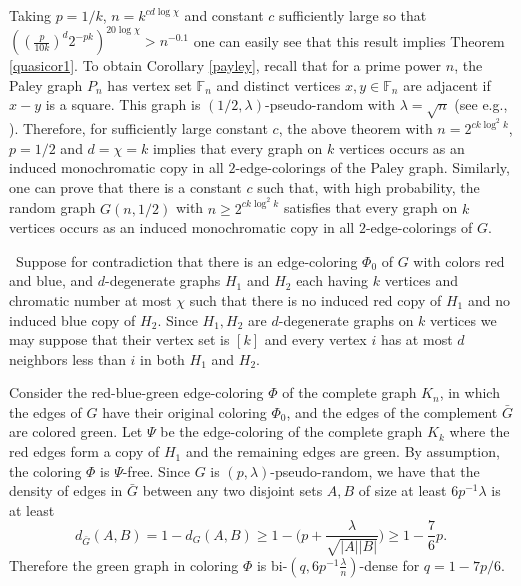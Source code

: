 \documentclass[11pt]{article}
\begin{document}
Taking $p=1/k$, $n=k^{cd\log \chi}$ and constant
$c$ sufficiently large so that $((\frac{p}{10k})^d2^{-pk})^{20\log \chi}>n^{-0.1}$
one can easily see that this result implies Theorem \ref{quasicor1}.
To obtain Corollary \ref{payley}, recall that for a prime power $n$, the Paley graph $P_n$ has vertex
set $\mathbb{F}_n$ and distinct vertices $x,y \in \mathbb{F}_n$ are
adjacent if $x-y$ is a square. This graph is $(1/2,\lambda)$-pseudo-random with $\lambda=\sqrt{n}$
(see e.g., \cite{KrSu}).
Therefore, for sufficiently large constant $c$, the above theorem with $n=2^{ck\log^2 k}$, $p=1/2$ and $d=\chi=k$
implies that every graph on $k$ vertices occurs as an
induced monochromatic copy in all $2$-edge-colorings of the Paley graph.
Similarly, one can prove that there is a constant $c$ such that, with high probability,
the random graph $G(n,1/2)$ with $n \geq 2^{ck\log^2 k}$ satisfies that every graph
on $k$ vertices occurs as an induced monochromatic copy in all
$2$-edge-colorings of $G$.


\vspace{0.1cm} \, Suppose for contradiction that there is
an edge-coloring $\Phi_0$ of $G$ with colors red and blue, and
$d$-degenerate graphs $H_1$ and $H_2$ each having $k$ vertices and
chromatic number at most $\chi$ such that there is no induced red
copy of $H_1$ and no induced blue copy of $H_2$. Since $H_1, H_2$
are $d$-degenerate graphs on $k$ vertices we may suppose that their
vertex set is $[k]$ and every vertex $i$ has at most $d$ neighbors
less than $i$ in both $H_1$ and $H_2$.


Consider the  red-blue-green edge-coloring $\Phi$ of the complete graph $K_n$, in which the
edges of $G$ have their original coloring $\Phi_0$,
and the edges of the complement $\bar G$ are colored green.
Let $\Psi$ be the edge-coloring of the complete graph $K_k$ where the red edges form a
copy of $H_1$ and the remaining edges are green. By assumption, the
coloring $\Phi$ is $\Psi$-free.
Since $G$ is $(p,\lambda)$-pseudo-random, we have that the density of edges
in $\bar G$ between any two disjoint sets $A, B$ of size at least $6p^{-1} \lambda$ is at least
$$d_{\bar G}(A,B)=1-d_G(A,B)\geq 1-\Big(p+\frac{\lambda}{\sqrt{|A||B|}}\Big) \geq 1-\frac{7}{6}p.$$
Therefore the green graph in coloring $\Phi$ is
bi-$(q,6p^{-1}\frac{\lambda}{n})$-dense for $q=1-7p/6$.
\end{document}
